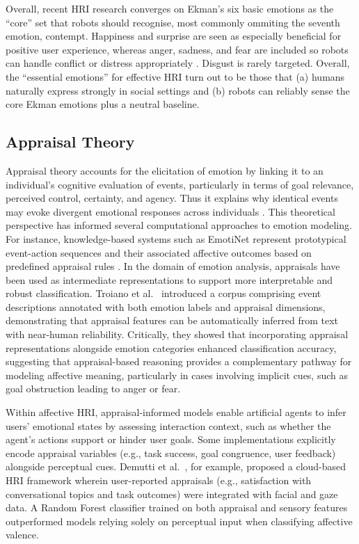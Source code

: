 Overall, recent HRI research converges on Ekman's six basic emotions as the ``core'' set that robots should recognise, most commonly ommiting the seventh emotion, contempt. Happiness and surprise are seen as especially beneficial for positive user experience, whereas anger, sadness, and fear are included so robots can handle conflict or distress appropriately \cite{Chuah2021-zw}. Disgust is rarely targeted. Overall, the ``essential emotions'' for effective HRI turn out to be those that (a) humans naturally express strongly in social settings and (b) robots can reliably sense the core Ekman emotions plus a neutral baseline.

\subsection{Appraisal Theory}

Appraisal theory accounts for the elicitation of emotion by linking it to an individual's cognitive evaluation of events, particularly in terms of goal relevance, perceived control, certainty, and agency. Thus it explains why identical events may evoke divergent emotional responses across individuals \cite{Suhaila_2021-ez}. This theoretical perspective has informed several computational approaches to emotion modeling. For instance, knowledge-based systems such as EmotiNet represent prototypical event-action sequences and their associated affective outcomes based on predefined appraisal rules \cite{Balahur2011-mb}. In the domain of emotion analysis, appraisals have been used as intermediate representations to support more interpretable and robust classification. Troiano et al.\ \cite{Troiano2023-if} introduced a corpus comprising event descriptions annotated with both emotion labels and appraisal dimensions, demonstrating that appraisal features can be automatically inferred from text with near-human reliability. Critically, they showed that incorporating appraisal representations alongside emotion categories enhanced classification accuracy, suggesting that appraisal-based reasoning provides a complementary pathway for modeling affective meaning, particularly in cases involving implicit cues, such as goal obstruction leading to anger or fear.

Within affective HRI, appraisal-informed models enable artificial agents to infer users' emotional states by assessing interaction context, such as whether the agent's actions support or hinder user goals. Some implementations explicitly encode appraisal variables (e.g., task success, goal congruence, user feedback) alongside perceptual cues. Demutti et al.\ \cite{Demutti2022-vz}, for example, proposed a cloud-based HRI framework wherein user-reported appraisals (e.g., satisfaction with conversational topics and task outcomes) were integrated with facial and gaze data. A Random Forest classifier trained on both appraisal and sensory features outperformed models relying solely on perceptual input when classifying affective valence.

